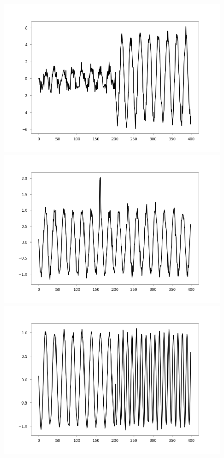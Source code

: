 \documentclass[intlimits, 9pt, unicode]{beamer}
\begin{document}
\begin{frame}
\begin{columns}[T,onlytextwidth]
\begin{figure}
		\includegraphics[scale=0.07]{images/examples_variance}
		\includegraphics[scale=0.07]{images/examples_outlier}
		\includegraphics[scale=0.07]{images/examples_periodic}
	\end{figure}

     \end{columns}


\end{frame}
\end{document}
